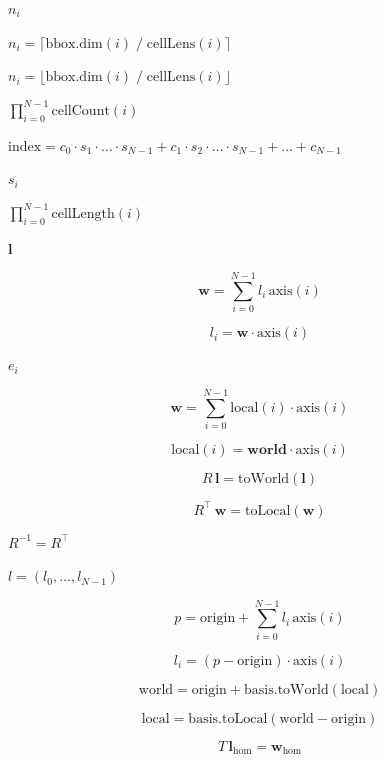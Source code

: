 \documentclass{article}
\begin{document}
$ n_i $
\pagebreak

$ n_i = \lceil \mathrm{bbox.dim}(i) \;/\; \mathrm{cellLens}(i) \rceil
$
\pagebreak

$ n_i = \lfloor \mathrm{bbox.dim}(i) \;/\; \mathrm{cellLens}(i)
  \rfloor $
\pagebreak

$ \prod_{i=0}^{N-1} \mathrm{cellCount}(i) $
\pagebreak

$ \mathrm{index} = c_0 \cdot s_1 \cdot \ldots \cdot s_{N-1}
    + c_1 \cdot s_2 \cdot \ldots \cdot s_{N-1} + \ldots + c_{N-1} $
\pagebreak

$ s_i $
\pagebreak

$ \prod_{i=0}^{N-1} \mathrm{cellLength}(i) $
\pagebreak

$ \mathbf{l} $
\pagebreak

\[  \mathbf{w} = \sum_{i=0}^{N-1} l_i \,\mathrm{axis}(i)
\]
\pagebreak

\[  l_i = \mathbf{w} \cdot \mathrm{axis}(i)
\]
\pagebreak

$ e_i $
\pagebreak

\[  \mathbf{w} = \sum_{i=0}^{N-1} \mathrm{local}(i) \cdot \mathrm{axis}(i)
\]
\pagebreak

\[  \mathrm{local}(i) = \mathbf{world} \cdot \mathrm{axis}(i)
\]
\pagebreak

\[ R \, \mathbf{l} = \mathrm{toWorld}(\mathbf{l}) \]
\pagebreak

\[ R^\top \, \mathbf{w} = \mathrm{toLocal}(\mathbf{w}) \]
\pagebreak

$ R^{-1} = R^\top $
\pagebreak

$ l = (l_0, \ldots, l_{N-1}) $
\pagebreak

\[  p = \mathrm{origin} + \sum_{i=0}^{N-1} l_i \,\mathrm{axis}(i)
\]
\pagebreak

\[  l_i = (p - \mathrm{origin}) \cdot \mathrm{axis}(i)
\]
\pagebreak

\[  \mathrm{world} = \mathrm{origin} +
\mathrm{basis.toWorld}(\mathrm{local})
\]
\pagebreak

\[  \mathrm{local} = \mathrm{basis.toLocal}(\mathrm{world} -
\mathrm{origin})
\]
\pagebreak

\[ T \, \mathbf{l}_{\mathrm{hom}} = \mathbf{w}_{\mathrm{hom}} \]
\pagebreak
\end{document}
